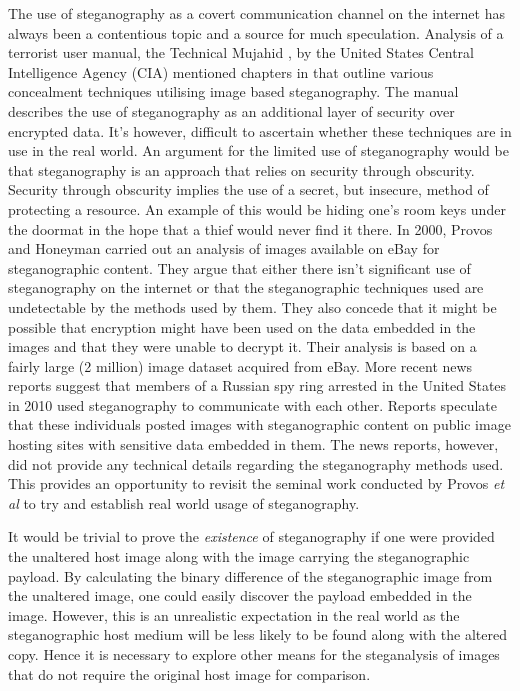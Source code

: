 \par The use of steganography as a covert communication channel on the internet has always been a contentious topic and a source for much speculation. Analysis of a terrorist user manual, the Technical Mujahid \cite{alfajr}, by the United States Central Intelligence Agency (CIA) mentioned chapters in that outline various concealment techniques utilising image based steganography. The manual describes the use of steganography as an additional layer of security over encrypted data. It's however, difficult to ascertain whether these techniques are in use in the real world. An argument for the limited use of steganography would be that steganography is an approach that relies on security through obscurity. Security through obscurity implies the use of a secret, but insecure, method of protecting a resource. An example of this would be hiding one's room keys under the doormat in the hope that a thief would never find it there. In 2000, Provos and Honeyman \cite{provos2001detecting}  carried out an analysis of images available on eBay for steganographic content.  They argue that either there isn't  significant use of steganography on the internet or that the steganographic techniques used are undetectable by the methods used by them. They also concede that it might be possible that encryption might have been used on the data embedded in the images and that they were unable to decrypt it. Their analysis is based on a fairly large (2 million) image dataset acquired from eBay.   More recent news reports  \cite{spies2010} suggest that members of a Russian spy ring arrested in the United States in 2010 used steganography to communicate with each other. Reports speculate that these individuals posted images with steganographic content on public image hosting sites with sensitive data embedded in them. The news reports, however, did not provide any technical details regarding the steganography methods used. This provides an opportunity to revisit the seminal work conducted by Provos \emph{et al} to try and establish real world usage of steganography.

It would be trivial to prove the \emph{existence} of steganography if one were provided the unaltered host image along with the image carrying the steganographic payload. By calculating the binary difference of the steganographic image from the unaltered image, one could easily discover the payload embedded in the image. However, this is an unrealistic expectation in the real world as the steganographic host medium will be less likely to be found along with the altered copy. Hence it is necessary to explore other means for the steganalysis of images that do not require the original host image for comparison.


